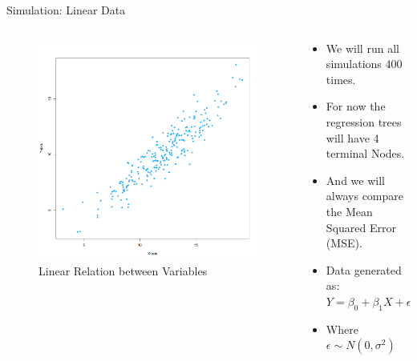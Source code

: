 \documentclass[10pt]{beamer}
\begin{document}
\begin{frame}{Simulation: Linear Data}
    \begin{columns}[T]
        \begin{column}{0.5\textwidth}
            \begin{figure}
            \centering
                \includegraphics[width=1\linewidth]{Linear Data before.png}
                \caption{Linear Relation between Variables}
                \label{fig:sub2}  %
            \end{figure}
        \end{column}
        \begin{column}{0.5\textwidth}
            \begin{itemize}
            \vspace{0.7cm}
                \item We will run all simulations 400 times.
                 \item For now the regression trees will have 4 terminal Nodes.
                \item And we will always compare the Mean Squared Error (MSE).
                \item Data generated as: $Y = \beta_0 + \beta_1X + \epsilon$
                \item Where $\epsilon \sim N(0, \sigma^2)$
            \end{itemize}
        \end{column}
    \end{columns}
\end{frame}
\end{document}
